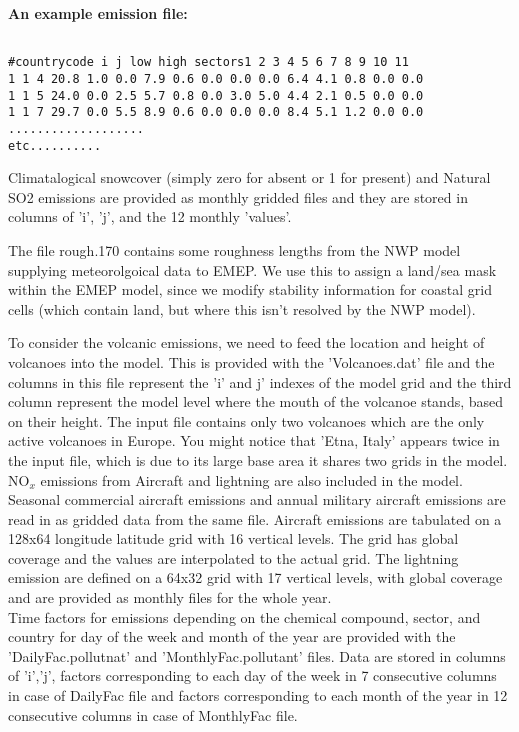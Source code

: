 \textbf{An example emission file:}
\begin{verbatim}

#countrycode i j low high sectors1 2 3 4 5 6 7 8 9 10 11 
1 1 4 20.8 1.0 0.0 7.9 0.6 0.0 0.0 0.0 6.4 4.1 0.8 0.0 0.0
1 1 5 24.0 0.0 2.5 5.7 0.8 0.0 3.0 5.0 4.4 2.1 0.5 0.0 0.0
1 1 7 29.7 0.0 5.5 8.9 0.6 0.0 0.0 0.0 8.4 5.1 1.2 0.0 0.0
...................
etc..........

\end{verbatim}
Climatalogical snowcover (simply zero for absent  or 1 for present) 
 and Natural SO2 emissions are provided as monthly gridded
files and they are stored in columns of 'i', 'j', and the 12 monthly
'values'. 

The file rough.170 contains some roughness lengths from the NWP model
supplying meteorolgoical data to EMEP. We use this to assign a land/sea
mask within the EMEP model, since we modify stability information
for coastal grid cells (which contain land, but where this isn't
resolved by the NWP model).
 

To consider the volcanic emissions, we need to feed the location and
height of volcanoes into the model.  This is provided with the
'Volcanoes.dat' file and the columns in this file represent the 'i'
and j' indexes of the model grid and the third column represent the
model level where the mouth of the volcanoe stands, based on their
height.  The input file contains only two volcanoes which are the only
active volcanoes in Europe.  You might notice that 'Etna, Italy'
appears twice in the input file, which is due to its large base area
it shares two grids in the model.  \\
     


NO$_{x}$ emissions from Aircraft and lightning are also included in the
model. Seasonal commercial aircraft emissions and annual military
aircraft emissions are read in as gridded data from the same file.  Aircraft emissions are tabulated on a 128x64 longitude latitude grid with 16 vertical levels. The grid has global coverage and the values are interpolated to the actual grid.
 The lightning emission are defined on a 64x32 grid with 17 vertical
 levels, with global coverage and are provided as monthly files for the whole
year.      \\

Time factors for emissions depending on the chemical compound, sector,
and country for day of the week and month of the year are provided with
the 'DailyFac.pollutnat' and 'MonthlyFac.pollutant' files.  Data are
stored in columns of 'i','j', factors corresponding to each day of the
week in 7 consecutive columns in case of DailyFac file and factors
corresponding to each month of the year in 12 consecutive columns in
case of MonthlyFac file.\\  

